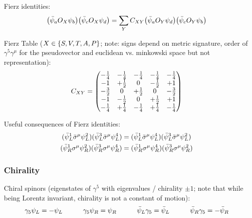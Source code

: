 			\noindent
			Fierz identities:
			\begin{equation}
				\qty(\bar{\psi}_a O_X \psi_b) \qty(\bar{\psi}_c O_X \psi_d)
				= \sum_Y C_{XY} \qty(\bar{\psi}_a O_Y \psi_d) \qty(\bar{\psi}_c O_Y \psi_b)
			\end{equation}

			\noindent
			Fierz Table ($X\in\qty{S,V,T,A,P}$; note: signs depend on metric signature, order of $\gamma^5 \gamma^\mu$ for the pseudovector and euclidean vs. minkowski space but not representation):
			\begin{equation}
				C_{XY} = \mqty(
				-\frac{1}{4} & -\frac{1}{4} & -\frac{1}{4} & -\frac{1}{4} & -\frac{1}{4} \\
				-1 & +\frac{1}{2} & 0 & -\frac{1}{2} & +1 \\
				-\frac{3}{2} & 0 & +\frac{1}{2} & 0 & -\frac{3}{2} \\
				-1 & -\frac{1}{2} & 0 & +\frac{1}{2} & +1 \\
				-\frac{1}{4} & +\frac{1}{4} & -\frac{1}{4} & +\frac{1}{4} & -\frac{1}{4} \\
				)
			\end{equation}

			\noindent
			Useful consequences of Fierz identities:
			\begin{align}
				(\bar{\psi}_L^1 \bar{\sigma}^\mu \psi_L^2) (\bar{\psi}_L^3 \bar{\sigma}^\mu \psi_L^4) &= (\bar{\psi}_L^1 \bar{\sigma}^\mu \psi_L^4) (\bar{\psi}_L^3 \bar{\sigma}^\mu \psi_L^2) \\
				(\bar{\psi}_R^1 \sigma^\mu \psi_R^2) (\bar{\psi}_R^3 \sigma^\mu \psi_R^4) &= (\bar{\psi}_R^1 \sigma^\mu \psi_R^4) (\bar{\psi}_R^3 \sigma^\mu \psi_R^2) \\
			\end{align}

		\subsubsection{Chirality}
			\noindent
			Chiral spinors (eigenstates of $\gamma^5$ with eigenvalues / chirality $\pm 1$; note that while being Lorentz invariant, chirality is not a constant of motion):
			\begin{equation}
				\gamma_5 \psi_L = - \psi_L
				\hspace{30pt} \gamma_5 \psi_R = \psi_R
				\hspace{30pt} \bar{\psi}_L \gamma_5 = \bar{\psi}_L
				\hspace{30pt} \bar{\psi}_R \gamma_5 = -\bar{\psi}_R
			\end{equation}

